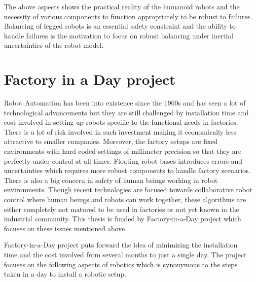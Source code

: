 \documentclass[a4paper,11pt,twoside]{StyleThese}
\begin{document}
The above aspects shows the practical reality of the humanoid robots and the necessity of various components to function appropriately to be robust to failures. Balancing of legged robots is an essential safety constraint and the ability to handle failures is the motivation to focus on robust   balancing under inertial uncertainties of the robot model.  



\section{Factory in a Day project}
Robot Automation has been into existence since the 1960s and has seen a lot of technological advancements but they are still challenged by installation time and cost involved in setting up robots specific to the functional needs in factories. There is a lot of risk involved in such investment making it economically less attractive to smaller companies. Moreover, the factory setups are fixed environments with hard coded settings of millimeter precision so that they are perfectly under control at all times. Floating robot bases introduces errors and uncertainties which requires more robust components to handle factory scenarios. There is also a big concern in safety of human beings working in robot environments. Though recent technologies are focused towards collaborative robot control where human beings and robots can work together, these algorithms are either completely not matured to be used in factories or not yet known in the industrial community. This thesis is funded by Factory-in-a-Day project which focuses on these issues mentioned above.

Factory-in-a-Day project puts forward the idea of minimizing the installation time and the cost involved from several months to just a single day. The project focuses on the following aspects of 
robotics which is synonymous to the steps taken in a day to install a robotic setup. 
\end{document}
